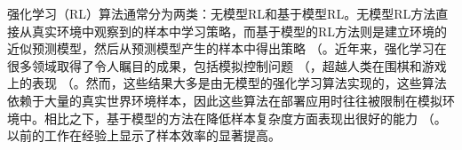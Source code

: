 强化学习（RL）算法通常分为两类：无模型RL和基于模型RL。无模型RL方法直接从真实环境中观察到的样本中学习策略，而基于模型的RL方法则是建立环境的近似预测模型，然后从预测模型产生的样本中得出策略 （\cite{chen2015reinforcement,polydoros2017survey}。近年来，强化学习在很多领域取得了令人瞩目的成果，包括模拟控制问题 （\cite{schulman2015high,lillicrap2015continuous,levine2016end}，超越人类在围棋和游戏上的表现 （\cite{mnih2015human,Silver2016mastering}。然而，这些结果大多是由无模型的强化学习算法实现的，这些算法依赖于大量的真实世界环境样本，因此这些算法在部署应用时往往被限制在模拟环境中。相比之下，基于模型的方法在降低样本复杂度方面表现出很好的能力 （\cite{deisenroth2013survey,berkenkamp2017safe}。以前的工作\cite{levine2016end,Chua2018DeepModels,janner2019trust}在经验上显示了样本效率的显著提高。



